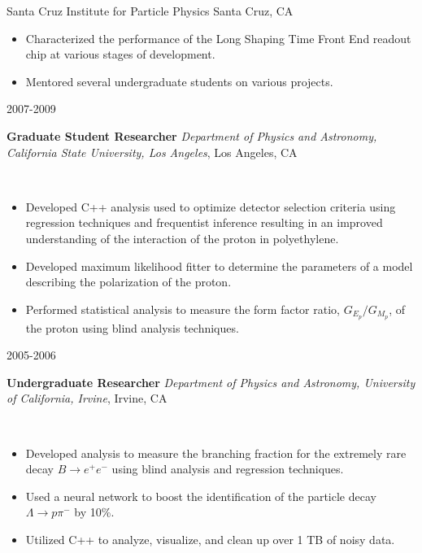 \documentclass[11pt]{article}
\newcommand{\experienceentry}[5] { 
    \noindent
    \begin{minipage}[t]{0.15\textwidth} \begin{flushright} #1 \end{flushright} \end{minipage} \hspace{0.01\textwidth}
    \begin{minipage}[t]{0.84\textwidth} 
        \textbf{#2} \newline
        \emph{#3}, #4 
    \end{minipage} \\[0.01pt]
    #5 \vspace{11pt}
}
\begin{document}
                        {Santa Cruz Institute for Particle Physics}
                        {Santa Cruz, CA}
                        {
                            \begin{itemize}[label=\textcolor{indigodye}{$\circ$}, noitemsep, nolistsep, leftmargin=0.19\textwidth]
                                \item Characterized the performance of the Long Shaping Time Front End readout chip at
                                      various stages of development.
                                \item Mentored several undergraduate students on various projects.
                            \end{itemize}
                        } 
        \experienceentry{2007-2009}
                        {Graduate Student Researcher}
                        {Department of Physics and Astronomy, California State University, Los Angeles}
                        {Los Angeles, CA}
                        {
                            \begin{itemize}[label=\textcolor{indigodye}{$\circ$}, noitemsep, nolistsep, leftmargin=0.19\textwidth]
                                \item Developed C++ analysis used to optimize detector selection criteria using regression
                                      techniques and frequentist inference resulting in an improved understanding of the
                                    interaction of the proton in polyethylene.
                                \item Developed maximum likelihood fitter to determine the parameters of a model describing
                                      the polarization of the proton.
                                \item Performed statistical analysis to measure the form factor ratio, $G_{E_p}/G_{M_p}$, of
                                      the proton using blind analysis techniques.
                            \end{itemize}
                        }  
        \experienceentry{2005-2006}
                        {Undergraduate Researcher}
                        {Department of Physics and Astronomy, University of California, Irvine}
                        {Irvine, CA}
                        { 
                            \begin{itemize}[label=\textcolor{indigodye}{$\circ$}, noitemsep, nolistsep, leftmargin=0.19\textwidth]
                                \item Developed analysis to measure the branching fraction for the extremely rare decay 
                                      $B\rightarrow e^+e^-$ using blind analysis and regression techniques.
                                \item Used a neural network to boost the identification of the particle decay 
                                      $\Lambda \rightarrow p \pi^-$ by 10\%.
                                \item Utilized C++ to analyze, visualize, and clean up over 1 TB of noisy data.
                            \end{itemize}
                       } 
\end{document}
